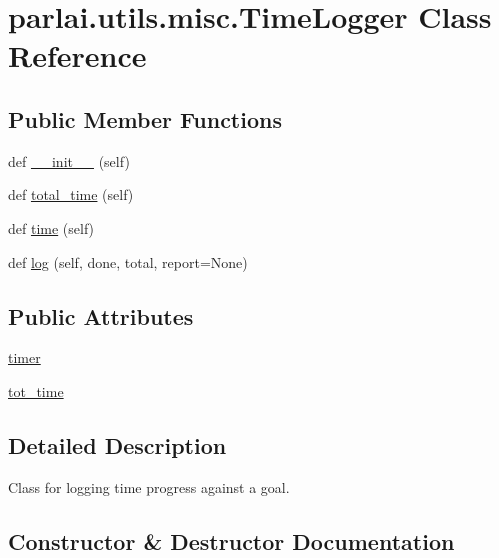 \hypertarget{classparlai_1_1utils_1_1misc_1_1TimeLogger}{}\section{parlai.\+utils.\+misc.\+Time\+Logger Class Reference}
\label{classparlai_1_1utils_1_1misc_1_1TimeLogger}
\subsection*{Public Member Functions}
\begin{DoxyCompactItemize}
\item 
def \hyperlink{classparlai_1_1utils_1_1misc_1_1TimeLogger_a11aae5a0adf1f9081b5a454b79c89b89}{\+\_\+\+\_\+init\+\_\+\+\_\+} (self)
\item 
def \hyperlink{classparlai_1_1utils_1_1misc_1_1TimeLogger_a18d3faec4442ed5b313c88d566f43b2d}{total\+\_\+time} (self)
\item 
def \hyperlink{classparlai_1_1utils_1_1misc_1_1TimeLogger_aa8e859dc10c12159501bbf545ca62a51}{time} (self)
\item 
def \hyperlink{classparlai_1_1utils_1_1misc_1_1TimeLogger_a52458d882781ad6a6cbcea479ff495de}{log} (self, done, total, report=None)
\end{DoxyCompactItemize}
\subsection*{Public Attributes}
\begin{DoxyCompactItemize}
\item 
\hyperlink{classparlai_1_1utils_1_1misc_1_1TimeLogger_a7592e5ebb754f91e73b66b409fda2d77}{timer}
\item 
\hyperlink{classparlai_1_1utils_1_1misc_1_1TimeLogger_a831849f16f6779f8b77289c3caa65689}{tot\+\_\+time}
\end{DoxyCompactItemize}


\subsection{Detailed Description}
\begin{DoxyVerb}Class for logging time progress against a goal.
\end{DoxyVerb}
 

\subsection{Constructor \& Destructor Documentation}
\mbox{\label{classparlai_1_1utils_1_1misc_1_1TimeLogger_a11aae5a0adf1f9081b5a454b79c89b89}} 
